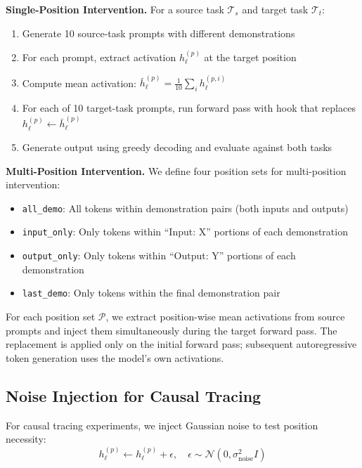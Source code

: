 \documentclass[sigconf,anonymous]{acmart}
\begin{document}
\textbf{Single-Position Intervention.} For a source task $\mathcal{T}_s$ and target task $\mathcal{T}_t$:
\begin{enumerate}
    \item Generate 10 source-task prompts with different demonstrations
    \item For each prompt, extract activation $h_\ell^{(p)}$ at the target position
    \item Compute mean activation: $\bar{h}_\ell^{(p)} = \frac{1}{10}\sum_i h_\ell^{(p,i)}$
    \item For each of 10 target-task prompts, run forward pass with hook that replaces $h_\ell^{(p)} \leftarrow \bar{h}_\ell^{(p)}$
    \item Generate output using greedy decoding and evaluate against both tasks
\end{enumerate}

\textbf{Multi-Position Intervention.} We define four position sets for multi-position intervention:
\begin{itemize}
    \item \texttt{all\_demo}: All tokens within demonstration pairs (both inputs and outputs)
    \item \texttt{input\_only}: Only tokens within ``Input: X'' portions of each demonstration
    \item \texttt{output\_only}: Only tokens within ``Output: Y'' portions of each demonstration
    \item \texttt{last\_demo}: Only tokens within the final demonstration pair
\end{itemize}

For each position set $\mathcal{P}$, we extract position-wise mean activations from source prompts and inject them simultaneously during the target forward pass. The replacement is applied only on the initial forward pass; subsequent autoregressive token generation uses the model's own activations.

\subsection{Noise Injection for Causal Tracing}

For causal tracing experiments, we inject Gaussian noise to test position necessity:
\begin{equation}
    h_\ell^{(p)} \leftarrow h_\ell^{(p)} + \epsilon, \quad \epsilon \sim \mathcal{N}(0, \sigma_\text{noise}^2 I)
\end{equation}
\end{document}
